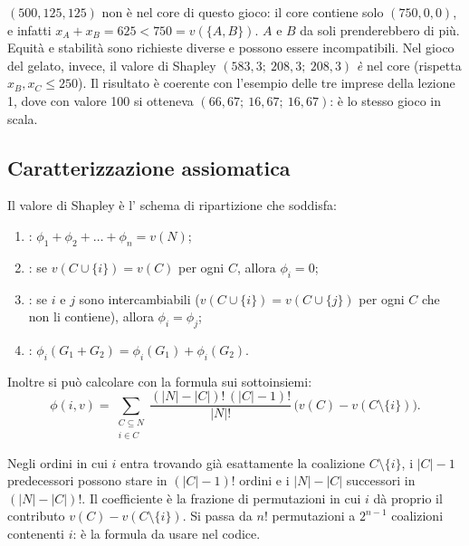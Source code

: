 \begin{extra}
$(500, 125, 125)$ non è nel core di questo gioco: il core contiene solo $(750,0,0)$, e infatti
$x_A + x_B = 625 < 750 = v(\{A,B\})$. $A$ e $B$ da soli prenderebbero di più. Equità e
stabilità sono richieste diverse e possono essere incompatibili. Nel gioco del gelato,
invece, il valore di Shapley $(583{,}3;\ 208{,}3;\ 208{,}3)$ \emph{è} nel core (rispetta
$x_B, x_C \le 250$). Il risultato è coerente con l'esempio delle tre imprese della lezione 1,
dove con valore 100 si otteneva $(66{,}67;\ 16{,}67;\ 16{,}67)$: è lo stesso gioco in scala.
\end{extra}

\subsection{Caratterizzazione assiomatica}

\begin{teorema}[Shapley]
Il valore di Shapley è l' schema di ripartizione che soddisfa:
\begin{enumerate}
  \item {}: $\phi_1 + \phi_2 + \dots + \phi_n = v(N)$;
  \item {}: se $v(C \cup \{i\}) = v(C)$ per ogni $C$, allora $\phi_i = 0$;
  \item {}: se $i$ e $j$ sono intercambiabili
        ($v(C \cup \{i\}) = v(C \cup \{j\})$ per ogni $C$ che non li contiene), allora
        $\phi_i = \phi_j$;
  \item {}: $\phi_i(G_1 + G_2) = \phi_i(G_1) + \phi_i(G_2)$.
\end{enumerate}
Inoltre si può calcolare con la formula sui sottoinsiemi:
\[
  \phi(i, v) = \sum_{\substack{C \subseteq N\\ i \in C}}
     \frac{(|N| - |C|)!\,(|C| - 1)!}{|N|!}\,\bigl( v(C) - v(C \setminus \{i\}) \bigr).
\]
\end{teorema}

\begin{osservazione}
Negli ordini in cui $i$ entra trovando già esattamente la coalizione $C \setminus \{i\}$,
i $|C|-1$ predecessori possono stare in $(|C|-1)!$ ordini e i $|N|-|C|$ successori in
$(|N|-|C|)!$. Il coefficiente è la frazione di permutazioni in cui $i$ dà proprio il
contributo $v(C) - v(C\setminus\{i\})$. Si passa da $n!$ permutazioni a $2^{n-1}$
coalizioni contenenti $i$: è la formula da usare nel codice.
\end{osservazione}

